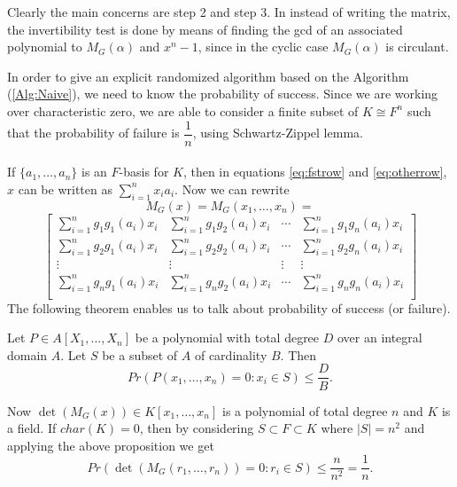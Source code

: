 \documentclass[sigconf]{acmart}
\theoremstyle{acmplain}
\begin{document}
 Clearly the main concerns are step 2 and step 3. In \cite{Giesbrecht} instead of writing the matrix, the invertibility
 test is done by means of finding the gcd of an associated polynomial to $M_G(\alpha)$ and $x^n-1$, since in the cyclic
 case $M_G(\alpha)$ is circulant.
 
 In order to give an explicit randomized algorithm based on the Algorithm (\ref{Alg:Naive}), we need to know 
 the probability of success. Since we are working over characteristic zero, we are able to consider a finite subset
 of $K \cong F^n$ such that the probability of failure is $\dfrac{1}{n}$, using 
 Schwartz-Zippel lemma.
 \\
 \\
 If $\lbrace a_1, \ldots , a_n \rbrace$ is an $F$-basis for $K$, then in equations
   \ref{eq:fstrow} and \ref{eq:otherrow}, $x$ can be written as $\sum_{i = 1}^nx_i
    a_i$. Now we can rewrite 
    $$
M_G(x) = M_G(x_1,\ldots,x_n) =  $$
$$
\begin{bmatrix}
\sum_{i = 1}^n g_1 g_1(a_i)x_i & \sum_{i = 1}^n g_1 g_2(a_i)x_i & \cdots & 
\sum_{i = 1}^n g_1 g_n(a_i)x_i \\
\sum_{i = 1}^n g_2 g_1(a_i)x_i & \sum_{i = 1}^n g_2 g_2(a_i)x_i & \cdots & 
\sum_{i = 1}^n g_2 g_n(a_i)x_i \\
\vdots		& \vdots	& \vdots & \vdots \\
\sum_{i = 1}^n g_n g_1(a_i)x_i & \sum_{i = 1}^n g_n g_2(a_i)x_i & \cdots & 
\sum_{i = 1}^n g_n g_n(a_i)x_i \\
\end{bmatrix}    
    $$ 
 The following theorem enables us to talk about probability of success (or failure).
 \begin{theorem}\cite[Proposition 98]{Zippel} \label{Thm:Zippel}
Let $P \in A[X_1, \ldots, X_n]$ be a polynomial with total degree $D$ over an integral domain $A$. Let $S$ be a subset of $A$ of cardinality $B$. Then $$Pr(P(x_1, \ldots , x_n)=0:x_i \in S) \leq \dfrac{D}{B}.$$
\end{theorem}

Now $\det(M_G(x)) \in K[x_1, \ldots , x_n]$ is a polynomial of total degree $n$ and $K$ is a field. If $char(K) =0$, then by considering $S \subset F \subset K$ where $|S| = n^2$ and applying the above proposition we get $$Pr(\det(M_G(r_1,\ldots , r_n)) = 0 : r_i \in S)\leq \dfrac{n}{n^2}= \dfrac{1}{n}.$$

 
\end{document}
